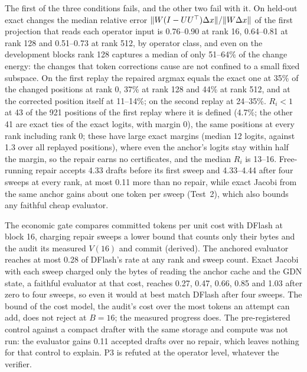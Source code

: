 The first of the three conditions fails, and the other two fail with it. On held-out exact changes the median relative error $\lVert W(I-UU^\top)\Delta x\rVert/\lVert W\Delta x\rVert$ of the first projection that reads each operator input is 0.76--0.90 at rank 16, 0.64--0.81 at rank 128 and 0.51--0.73 at rank 512, by operator class, and even on the development blocks rank 128 captures a median of only 51--64\% of the change energy: the changes that token corrections cause are not confined to a small fixed subspace. On the first replay the repaired argmax equals the exact one at 35\% of the changed positions at rank 0, 37\% at rank 128 and 44\% at rank 512, and at the corrected position itself at 11--14\%; on the second replay at 24--35\%. $R_i<1$ at 43 of the 921 positions of the first replay where it is defined (4.7\%; the other 41 are exact ties of the exact logits, with margin 0), the same positions at every rank including rank 0; these have large exact margins (median 12 logits, against 1.3 over all replayed positions), where even the anchor's logits stay within half the margin, so the repair earns no certificates, and the median $R_i$ is 13--16. Free-running repair accepts 4.33 drafts before its first sweep and 4.33--4.44 after four sweeps at every rank, at most 0.11 more than no repair, while exact Jacobi from the same anchor gains about one token per sweep (Test~2), which also bounds any faithful cheap evaluator.

The economic gate compares committed tokens per unit cost with DFlash at block 16, charging repair sweeps a lower bound that counts only their bytes and the audit its measured $V(16)$ and commit (derived). The anchored evaluator reaches at most 0.28 of DFlash's rate at any rank and sweep count. Exact Jacobi with each sweep charged only the bytes of reading the anchor cache and the GDN state, a faithful evaluator at that cost, reaches 0.27, 0.47, 0.66, 0.85 and 1.03 after zero to four sweeps, so even it would at best match DFlash after four sweeps. The bound of the cost model, the audit's cost over the most tokens an attempt can add, does not reject at $B=16$; the measured progress does. The pre-registered control against a compact drafter with the same storage and compute was not run: the evaluator gains 0.11 accepted drafts over no repair, which leaves nothing for that control to explain. P3 is refuted at the operator level, whatever the verifier.\label{sec:repair-verdict}

